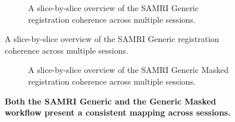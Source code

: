 \begin{figure}[h!]
	\centering
	\begin{subfigure}[t]{1\textwidth}
		\centering
		\setlength{\fboxsep}{0pt}%
		\setlength{\fboxrule}{0.2pt}%
		\caption{A slice-by-slice overview of the SAMRI Generic registration coherence across multiple sessions.}
	\end{subfigure}
\end{figure}
\begin{figure}[h!]\ContinuedFloat
	\begin{subfigure}[t]{1\textwidth}
		\centering
		\setlength{\fboxsep}{0pt}%
		\setlength{\fboxrule}{0.2pt}%
		\caption{A slice-by-slice overview of the SAMRI Generic Masked registration coherence across multiple sessions.}
	\end{subfigure}
	\caption{
		\textbf{Both the SAMRI Generic and the Generic Masked workflow present a consistent mapping across sessions.}
		}
 	\label{fig:coherence}
\end{figure}

